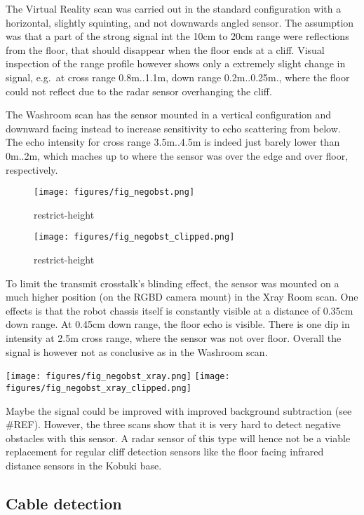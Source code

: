 The Virtual Reality scan was carried out in the standard configuration
with a horizontal, slightly squinting, and not downwards angled sensor.
The assumption was that a part of the strong signal int the 10cm to 20cm
range were reflections from the floor, that should disappear when the
floor ends at a cliff. Visual inspection of the range profile however
shows only a extremely slight change in signal, e.g.~at cross range
0.8m..1.1m, down range 0.2m..0.25m., where the floor could not reflect
due to the radar sensor overhanging the cliff.

The Washroom scan has the sensor mounted in a vertical configuration and
downward facing instead to increase sensitivity to echo scattering from
below. The echo intensity for cross range 3.5m..4.5m is indeed just
barely lower than 0m..2m, which maches up to where the sensor was over
the edge and over floor, respectively.

\begin{figure}
\centering
\texttt{[image: figures/fig\_negobst.png]}
\caption{restrict-height}
\end{figure}

\begin{figure}
\centering
\texttt{[image: figures/fig\_negobst\_clipped.png]}
\caption{restrict-height}
\end{figure}

To limit the transmit crosstalk's blinding effect, the sensor was
mounted on a much higher position (on the RGBD camera mount) in the Xray
Room scan. One effects is that the robot chassis itself is constantly
visible at a distance of 0.35cm down range. At 0.45cm down range, the
floor echo is visible. There is one dip in intensity at 2.5m cross
range, where the sensor was not over floor. Overall the signal is
however not as conclusive as in the Washroom scan.

\texttt{[image: figures/fig\_negobst\_xray.png]}
\texttt{[image: figures/fig\_negobst\_xray\_clipped.png]}

Maybe the signal could be improved with improved background subtraction
(see \#REF). However, the three scans show that it is very hard to
detect negative obstacles with this sensor. A radar sensor of this type
will hence not be a viable replacement for regular cliff detection
sensors like the floor facing infrared distance sensors in the Kobuki
base.

\subsection{Cable detection}\label{cable-detection}

